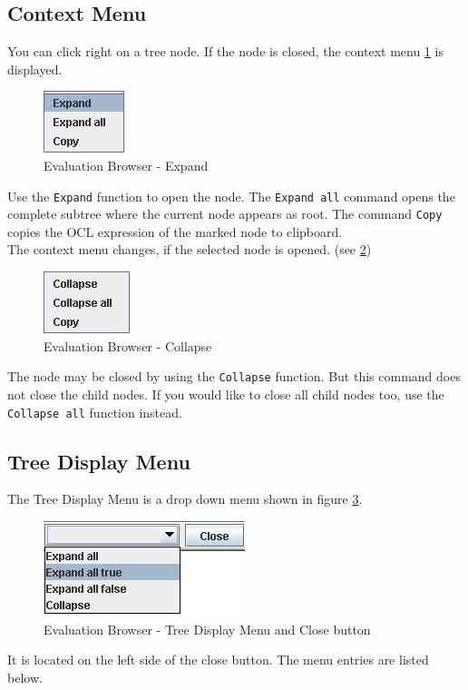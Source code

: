 \documentclass[a4paper,titlepage,oneside,final]{scrreprt} %
\begin{document}
\subsection{Context Menu}
You can click right on a tree node. If the node is closed, the context menu \ref{fig:EvaluationBrowserExpand}
is displayed.
\begin{figure}[ht]
\centering
\includegraphics[scale=0.7]{Screenshots/GUI/EvaluationBrowserExpand.png}
\caption{Evaluation Browser - Expand}
\label{fig:EvaluationBrowserExpand}
\end{figure}
Use the \verb+Expand+ function to open the node. The \verb+Expand all+ command opens the complete
subtree where the current node appears as root. The command \verb+Copy+ copies the OCL expression of the
marked node to clipboard.\\
The context menu changes, if the selected node is opened. (see \ref{fig:EvaluationBrowserCollapse})
\begin{figure}[ht]
\centering
\includegraphics[scale=0.7]{Screenshots/GUI/EvaluationBrowserCollapse.png}
\caption{Evaluation Browser - Collapse}
\label{fig:EvaluationBrowserCollapse}
\end{figure}
The node may be closed by using the \verb+Collapse+ function. But this command
does not close the child nodes. If you would like to close all child nodes too,
use the \verb+Collapse all+ function instead.
\subsection{Tree Display Menu}
The Tree Display Menu is a drop down menu shown in figure \ref{fig:EvaluationBrowserTreeDisplayAndClose}.
\begin{figure}[ht]
\centering
\includegraphics[scale=0.7]{Screenshots/GUI/EvaluationBrowserTreeDisplayAndClose.png}
\caption{Evaluation Browser - Tree Display Menu and Close button}
\label{fig:EvaluationBrowserTreeDisplayAndClose}
\end{figure}
It is located on the left side of the close button. The menu entries are listed below.
\end{document}

